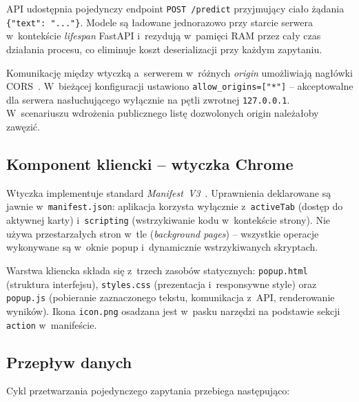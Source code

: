 \documentclass[oneside,polski,logo]{amuthesis}
\begin{document}
API udostępnia pojedynczy endpoint \texttt{POST /predict} przyjmujący
ciało żądania \texttt{\{"text": "..."\}}. Modele są ładowane jednorazowo
przy starcie serwera w~kontekście \textit{lifespan} FastAPI i~rezydują
w~pamięci RAM przez cały czas działania procesu, co eliminuje koszt
deserializacji przy każdym zapytaniu.

Komunikację między wtyczką a~serwerem w~różnych \textit{origin}
umożliwiają nagłówki CORS~\cite{w3c_cors}. W~bieżącej konfiguracji
ustawiono \texttt{allow\_origins=["*"]} -- akceptowalne dla serwera
nasłuchującego wyłącznie na pętli zwrotnej \texttt{127.0.0.1}.
W~scenariuszu wdrożenia publicznego listę dozwolonych origin należałoby zawęzić.

\subsection*{Komponent kliencki -- wtyczka Chrome}

Wtyczka implementuje standard \textit{Manifest~V3}~\cite{chrome_mv3}.
Uprawnienia deklarowane są jawnie w~\texttt{manifest.json}: aplikacja
korzysta wyłącznie z~\texttt{activeTab} (dostęp do aktywnej karty)
i~\texttt{scripting} (wstrzykiwanie kodu w~kontekście strony). Nie
używa przestarzałych stron w~tle (\textit{background pages}) -- wszystkie
operacje wykonywane są w~oknie popup i~dynamicznie wstrzykiwanych skryptach.

Warstwa kliencka składa się z~trzech zasobów statycznych:
\texttt{popup.html} (struktura interfejsu), \texttt{styles.css}
(prezentacja i~responsywne style) oraz \texttt{popup.js} (pobieranie
zaznaczonego tekstu, komunikacja z~API, renderowanie wyników).
Ikona \texttt{icon.png} osadzana jest w~pasku narzędzi na podstawie
sekcji \texttt{action} w~manifeście.

\subsection*{Przepływ danych}

Cykl przetwarzania pojedynczego zapytania przebiega następująco:
\end{document}
